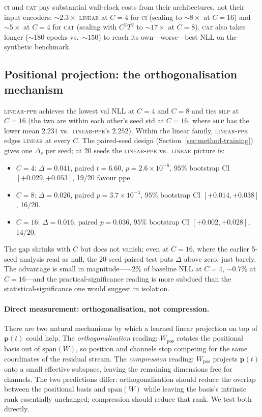 \documentclass[11pt]{article}
\begin{document}
\textsc{ci} and \textsc{cat} pay substantial wall-clock costs from
their architectures, not their input encoders: ${\sim}2.3\times$
\textsc{linear} at $C{=}4$ for \textsc{ci} (scaling to
${\sim}8\times$ at $C{=}16$) and ${\sim}5\times$ at $C{=}4$ for
\textsc{cat} (scaling with $C^2 T^2$ to ${\sim}17\times$ at
$C{=}8$). \textsc{cat} also takes longer
(${\sim}180$ epochs vs.\ ${\sim}150$) to reach its
own---worse---best NLL on the synthetic benchmark.

\subsection{Positional projection: the orthogonalisation mechanism}
\label{sec:results-pospro}

\textsc{linear-ppe} achieves the lowest val NLL at $C{=}4$ and
$C{=}8$ and ties \textsc{mlp} at $C{=}16$ (the two are within each
other's seed std at $C{=}16$, where \textsc{mlp} has the lower
mean $2.231$ vs.\ \textsc{linear-ppe}'s $2.252$). Within the
linear family, \textsc{linear-ppe} edges \textsc{linear} at every
$C$. The paired-seed design (Section~\ref{sec:method-training})
gives one $\Delta_s$ per seed; at $20$ seeds the
\textsc{linear-ppe} vs.\ \textsc{linear} picture is:

\begin{itemize}
\item $C{=}4$: $\Delta = 0.041$, paired $t{=}6.60$,
  $p{=}2.6{\times}10^{-6}$, $95\%$ bootstrap CI $[+0.029, +0.053]$,
  19/20 favour ppe.
\item $C{=}8$: $\Delta = 0.026$, paired $p{=}3.7{\times}10^{-4}$,
  $95\%$ bootstrap CI $[+0.014, +0.038]$, 16/20.
\item $C{=}16$: $\Delta = 0.016$, paired $p{=}0.036$, $95\%$ bootstrap
  CI $[+0.002, +0.028]$, 14/20.
\end{itemize}

The gap shrinks with $C$ but does not vanish; even at $C{=}16$, where
the earlier 5-seed analysis read as null, the 20-seed paired test
puts $\Delta$ above zero, just barely. The advantage is small in
magnitude---$\sim$$2\%$ of baseline NLL at $C{=}4$, $\sim$$0.7\%$ at
$C{=}16$---and the practical-significance reading is more subdued
than the statistical-significance one would suggest in isolation.

\paragraph{Direct measurement: orthogonalisation, not compression.}
There are two natural mechanisms by which a learned linear
projection on top of $\mathbf{p}(t)$ could help. The
\emph{orthogonalisation} reading: $W_{\text{pos}}$ rotates the
positional basis out of $\mathrm{span}(W)$, so position and
channels stop competing for the same coordinates of the residual
stream. The \emph{compression} reading: $W_{\text{pos}}$ projects
$\mathbf{p}(t)$ onto a small effective subspace, leaving the
remaining dimensions free for channels. The two predictions differ:
orthogonalisation should reduce the overlap between the
positional basis and $\mathrm{span}(W)$ while leaving the basis's
intrinsic rank essentially unchanged; compression should reduce
that rank. We test both directly.
\end{document}
